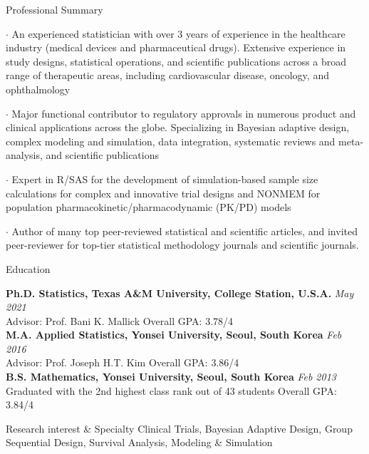 \documentclass[
	11pt, %
]{resume} %
\begin{document}

\begin{rSection}{Professional Summary}
		\item[$\cdot$] An experienced statistician with over 3 years of experience in the healthcare industry (medical devices and pharmaceutical drugs). Extensive experience in study designs, statistical operations, and scientific publications across a broad range of therapeutic areas, including cardiovascular disease, oncology, and ophthalmology
		\item[$\cdot$] Major functional contributor to regulatory approvals in numerous product and clinical applications across the globe. Specializing in Bayesian adaptive design, complex modeling and simulation, data integration, systematic reviews and meta-analysis, and scientific publications
		\item[$\cdot$] Expert in R/SAS for the development of simulation-based sample size calculations for complex and innovative trial designs and NONMEM for population pharmacokinetic/pharmacodynamic (PK/PD) models
		\item[$\cdot$] Author of many top peer-reviewed statistical and scientific articles, and invited peer-reviewer for top-tier statistical methodology journals and scientific journals.
\end{rSection}

\begin{rSection}{Education}
	
	\textbf{Ph.D. Statistics, Texas A\&M University, College Station, U.S.A.} \hfill \textit{May 2021} \\ 
Advisor: Prof. Bani K. Mallick
\hfill {Overall GPA: 3.78/4}
\\
	\textbf{M.A. Applied Statistics, Yonsei University, Seoul, South Korea} \hfill {\em Feb 2016} \\ 
Advisor: Prof. Joseph H.T. Kim
\hfill {Overall GPA: 3.86/4}
\\
{\bf B.S. Mathematics, Yonsei University, Seoul, South Korea} \hfill {\em Feb 2013} \\ 
Graduated with the 2nd highest class rank out of 43 students
\hfill {Overall GPA: 3.84/4}
\end{rSection}

\begin{rSection}{Research interest \& Specialty}
Clinical Trials, Bayesian Adaptive Design, Group Sequential Design, Survival Analysis, Modeling \& Simulation
\end{rSection}
\end{document}
